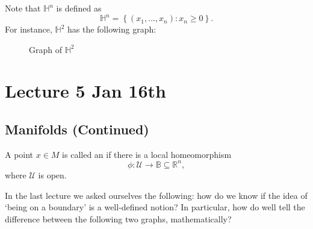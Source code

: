 \documentclass[notoc,notitlepage]{tufte-book}
\begin{document}
\begin{note}
  Note that $\mathbb{H}^n$ is defined as
  \begin{equation*}
    \mathbb{H}^n = \left\{ ( x_1, \ldots, x_n ) : x_n \geq 0 \right\}.
  \end{equation*}
  For instance, $\mathbb{H}^2$ has the following graph:
  \begin{figure}[ht]
    \centering
    \caption{Graph of $\mathbb{H}^2$}
    \label{fig:graph_of_h_2}
  \end{figure}
\end{note}



%
\label{prt:introduction_to_topological_manifolds}

\chapter{Lecture 5 Jan 16th}%
\label{chp:lecture_5_jan_16th}

\section{Manifolds (Continued)}%
\label{sec:manifolds_continued}

\begin{defn}\label{defn:interior_point}
  A point $x \in M$ is called an  if there is a local
  homeomorphism
  \begin{equation*}
    \phi : \mathcal{U} \to \mathbb{B} \subseteq \mathbb{R}^n,
  \end{equation*}
  where $\mathcal{U}$ is open.
\end{defn}

In the last lecture we asked ourselves the following: how do we know if the
idea of `being on a boundary' is a well-defined notion? In particular, how
do well tell the difference between the following two graphs, mathematically?
\end{document}

